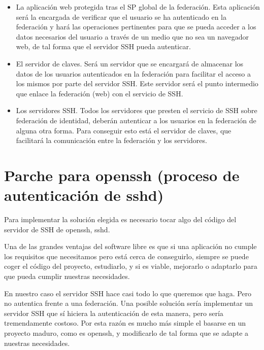     \begin{itemize}
        
        \item La aplicación web protegida tras el SP global de la
        federación. Esta aplicación será la encargada de verificar que el
        usuario se ha autenticado en la federación y hará las operaciones
        pertinentes para que se pueda acceder a los datos necesarios del
        usuario a través de un medio que no sea un navegador web, de tal
        forma que el servidor SSH pueda autenticar.

        \item El servidor de claves. Será un servidor que se encargará de
        almacenar los datos de los usuarios autenticados en la federación
        para facilitar el acceso a los mismos por parte del servidor SSH.
        Este servidor será el punto intermedio que enlace la federación
        (web) con el servicio de SSH.

        \item Los servidores SSH. Todos los servidores que presten el
        servicio de SSH sobre federación de identidad, deberán autenticar a
        los usuarios en la federación de alguna otra forma. Para
        conseguir esto está el servidor de claves, que facilitará la
        comunicación entre la federación y los servidores.

    \end{itemize}

    \section{Parche para openssh (proceso de autenticación de sshd)}
    \label{openssh}

    Para implementar la solución elegida es necesario tocar algo del
    código del servidor de SSH de openssh, sshd.

    Una de las grandes ventajas del software libre es que si una aplicación
    no cumple los requisitos que necesitamos pero está cerca de
    conseguirlo, siempre se puede coger el código del proyecto, estudiarlo,
    y si es viable, mejorarlo o adaptarlo para que pueda cumplir nuestras
    necesidades.

    En nuestro caso el servidor SSH hace casi todo lo que queremos que
    haga. Pero no autentica frente a una federación. Una posible solución
    sería implementar un servidor SSH que sí hiciera la autenticación de
    esta manera, pero sería tremendamente costoso. Por esta razón es mucho
    más simple el basarse en un proyecto maduro, como es openssh, y
    modificarlo de tal forma que se adapte a nuestras necesidades.

